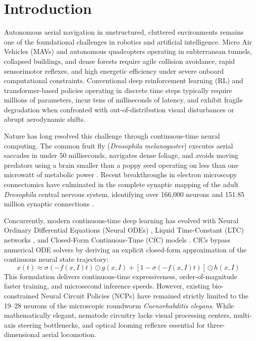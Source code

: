 \documentclass{article}
\begin{document}
\section{Introduction}
Autonomous aerial navigation in unstructured, cluttered environments remains one of the foundational challenges in robotics and artificial intelligence. Micro Air Vehicles (MAVs) and autonomous quadcopters operating in subterranean tunnels, collapsed buildings, and dense forests require agile collision avoidance, rapid sensorimotor reflexes, and high energetic efficiency under severe onboard computational constraints. Conventional deep reinforcement learning (RL) and transformer-based policies operating in discrete time steps typically require millions of parameters, incur tens of milliseconds of latency, and exhibit fragile degradation when confronted with out-of-distribution visual disturbances or abrupt aerodynamic shifts.

Nature has long resolved this challenge through continuous-time neural computing. The common fruit fly (\emph{Drosophila melanogaster}) executes aerial saccades in under 50 milliseconds, navigates dense foliage, and avoids moving predators using a brain smaller than a poppy seed operating on less than one microwatt of metabolic power \cite{floreano2009vision, franceschini1992micro}. Recent breakthroughs in electron microscopy connectomics have culminated in the complete synaptic mapping of the adult \emph{Drosophila} central nervous system, identifying over 166,000 neurons and 151.85 million synaptic connections \cite{berg2026sexual, takemura2023connectome, dorkenwald2024neuronal, schlegel2024whole}.

Concurrently, modern continuous-time deep learning has evolved with Neural Ordinary Differential Equations (Neural ODEs) \cite{chen2018neural}, Liquid Time-Constant (LTC) networks \cite{hasani2021liquid}, and Closed-Form Continuous-Time (CfC) models \cite{hasani2022closed}. CfCs bypass numerical ODE solvers by deriving an explicit closed-form approximation of the continuous neural state trajectory:
\begin{equation}
x(t) \approx \sigma(-f(x, I)t) \odot g(x, I) + [1 - \sigma(-f(x, I)t)] \odot h(x, I)
\end{equation}
This formulation delivers continuous-time expressiveness, order-of-magnitude faster training, and microsecond inference speeds. However, existing bio-constrained Neural Circuit Policies (NCPs) \cite{lechner2020neural} have remained strictly limited to the 19--28 neurons of the microscopic roundworm \emph{Caenorhabditis elegans}. While mathematically elegant, nematode circuitry lacks visual processing centers, multi-axis steering bottlenecks, and optical looming reflexes essential for three-dimensional aerial locomotion.
\end{document}
